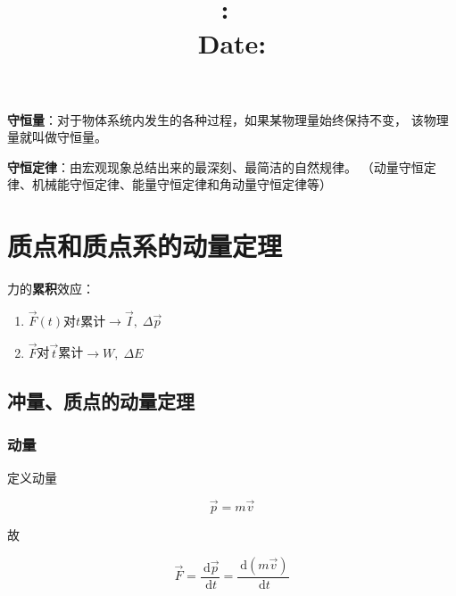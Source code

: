 \documentclass[12pt, a4paper]{article}
\title{
    \vspace{2in}
    \textmd{\textbf{\hmwkClass:\ \hmwkTitle}}\\
    \normalsize\vspace{0.1in}\small{Date: \hmwkDueDate}\\
    \vspace{0.1in}\large{\textit{\myUniversiy}}
    \vspace{3in}
}
\author{\hmwkAuthorName}
\date{}
\numberwithin{equation}{section}
\newcommand{\rmd}{\mathrm{~d}}
\newcommand{\deriv}[2]{\frac{\rmd #1}{\rmd #2}}
\begin{document}
\maketitle

\pagebreak


\tableofcontents

\pagebreak


\pagebreak

    \textbf{守恒量}：对于物体系统内发生的各种过程，如果某物理量始终保持不变，
    该物理量就叫做守恒量。

    \textbf{守恒定律}：由宏观现象总结出来的最深刻、最简洁的自然规律。
    （动量守恒定律、机械能守恒定律、能量守恒定律和角动量守恒定律等）

\section{质点和质点系的动量定理}

    力的\textbf{累积}效应：

    \begin{enumerate}
        \item \(\overrightarrow{F}\left(t\right)\)对\(t\)累计\(\rightarrow \overrightarrow{I},\; \Delta \overrightarrow{p}\)
        \item \(\overrightarrow{F}\)对\(\overrightarrow{t}\)累计\(\rightarrow W,\; \Delta E\)
    \end{enumerate}

\subsection{冲量、质点的动量定理}

\subsubsection{动量}

    定义动量

    \begin{equation}
        \overrightarrow{p} = m\overrightarrow{v}
    \end{equation}

    故

    \begin{equation}
        \overrightarrow{F} = \deriv{\overrightarrow{p}}{t} = \deriv{\left(m\overrightarrow{v}\right)}{t}
    \end{equation}
\end{document}
